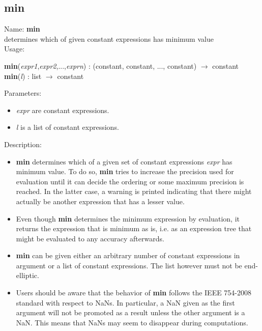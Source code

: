 \subsection{min}
\label{labmin}
\noindent Name: \textbf{min}\\
determines which of given constant expressions has minimum value\\
\noindent Usage: 
\begin{center}
\textbf{min}(\emph{expr1},\emph{expr2},...,\emph{exprn}) : (\textsf{constant}, \textsf{constant}, ..., \textsf{constant}) $\rightarrow$ \textsf{constant}\\
\textbf{min}(\emph{l}) : \textsf{list} $\rightarrow$ \textsf{constant}\\
\end{center}
Parameters: 
\begin{itemize}
\item \emph{expr} are constant expressions.
\item \emph{l} is a list of constant expressions.
\end{itemize}
\noindent Description: \begin{itemize}

\item \textbf{min} determines which of a given set of constant expressions
   \emph{expr} has minimum value. To do so, \textbf{min} tries to increase the
   precision used for evaluation until it can decide the ordering or some
   maximum precision is reached. In the latter case, a warning is printed
   indicating that there might actually be another expression that has a
   lesser value.

\item Even though \textbf{min} determines the minimum expression by evaluation, it 
   returns the expression that is minimum as is, i.e. as an expression
   tree that might be evaluated to any accuracy afterwards.

\item \textbf{min} can be given either an arbitrary number of constant
   expressions in argument or a list of constant expressions. The list
   however must not be end-elliptic.

\item Users should be aware that the behavior of \textbf{min} follows the IEEE
   754-2008 standard with respect to NaNs. In particular, a NaN given as
   the first argument will not be promoted as a result unless the other
   argument is a NaN. This means that NaNs may seem to disappear during
   computations.
\end{itemize}
